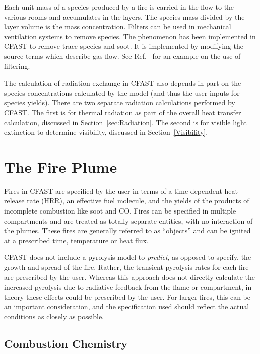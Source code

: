 \documentclass[12pt,twoside]{book}
\begin{document}
Each unit mass of a species produced by a fire is carried in the flow to the various rooms and accumulates in the layers. The species mass divided by the layer volume is the mass concentration. Filters can be used in mechanical ventilation systems to remove species. The phenomenon has been implemented in CFAST to remove trace species and soot. It is implemented by modifying the source terms which describe gas flow. See Ref.~\cite{Jones:2008} for an example on the use of filtering.

The calculation of radiation exchange in CFAST also depends in part on the species concentrations calculated by the model (and thus the user inputs for species yields). There are two separate radiation calculations performed by CFAST. The first is for thermal radiation as part of the overall heat transfer calculation, discussed in Section~\ref{sec:Radiation}. The second is for visible light extinction to determine visibility, discussed in Section~\ref{Visibility}.

%
%

\chapter{The Fire Plume}
\label{sec:TheFire}

Fires in CFAST are specified by the user in terms of a time-dependent heat release rate (HRR), an effective fuel molecule, and the yields of the products of incomplete combustion like soot and CO. Fires can be specified in multiple compartments and are treated as totally separate entities, with no interaction of the plumes. These fires are generally referred to as ``objects'' and can be ignited at a prescribed time, temperature or heat flux.

CFAST does not include a pyrolysis model to {\em predict}, as opposed to specify, the growth and spread of the fire. Rather, the transient pyrolysis rates for each fire are prescribed by the user. Whereas this approach does not directly calculate the increased pyrolysis due to radiative feedback from the flame or compartment, in theory these effects could be prescribed by the user. For larger fires, this can be an important consideration, and the specification used should reflect the actual conditions as closely as possible.

\section{Combustion Chemistry}
\end{document}
